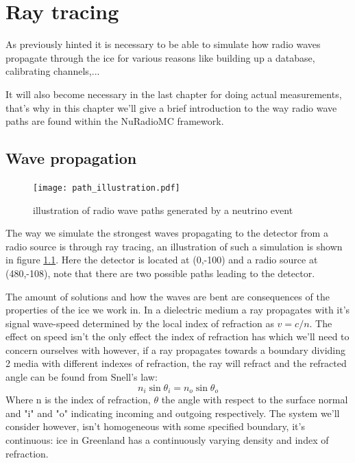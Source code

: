 \chapter{Ray tracing}
As previously hinted it is necessary to be able to simulate how radio waves
propagate through the ice for various reasons like building up a database, calibrating channels,...

It will also become necessary in the last chapter for doing actual measurements,
that's why in this chapter we'll give a brief introduction to the way radio wave
paths are found within the NuRadioMC framework.
\section{Wave propagation}
\begin{figure}[h!]
	\centering
	\texttt{[image: path\_illustration.pdf]}
	\label{fig:PathIllu}
	\caption{illustration of radio wave paths generated by a neutrino event}
\end{figure}
The way we simulate the strongest waves propagating to the detector from a
radio source is through ray tracing, an illustration of such a simulation is
shown in figure \ref{fig:PathIllu}.  Here the detector is located at (0,-100)
and a radio source at (480,-108), note that there are two possible paths
leading to the detector.

The amount of solutions and how the waves are bent are consequences of the
properties of the ice we work in.  In a dielectric medium a ray propagates with
it's signal wave-speed determined by the local index of refraction as $v =
c/n$.   The effect on speed isn't the only effect the index of refraction has
which we'll need to concern ourselves with however, if a ray propagates towards
a boundary dividing 2 media with different indexes of refraction, the ray will
refract and the refracted angle can be found from Snell's law:
\begin{equation}
	n_i\sin{\theta_i} = n_o\sin{\theta_o}
\end{equation}
Where n is the index of refraction, $\theta$ the angle with respect to the
surface normal and "i" and "o" indicating incoming and outgoing respectively.
The system we'll consider however, isn't homogeneous with some specified
boundary, it's continuous: ice in Greenland has a continuously varying density and
index of refraction.


